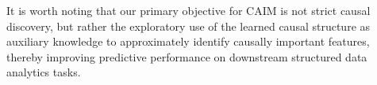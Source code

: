 \documentclass[sigconf, nonacm]{acmart}
\newcommand{\syadd}[1]{{\color{black}#1}}
\newcommand{\syfix}[1]{{\color{black}#1}}
\newcommand{\syne}[1]{{\color{black}#1}}
\newcommand{\vldb}[1]{{\color{red}#1}}
\newcommand*{\ourmodel}{CAIM}
\begin{document}
\syfix{
It is worth noting that our primary objective \syne{for} \ourmodel{} is not strict causal discovery, but rather the exploratory use of the learned causal structure as auxiliary knowledge to approximately identify causally important features, thereby improving predictive performance on downstream structured data analytics tasks.
}

\end{document}
